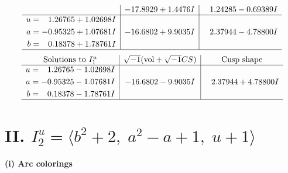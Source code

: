 \documentclass[1p]{elsarticle_modified}
\theoremstyle{definition}
\newcommand{\I}{\sqrt{-1}}
\begin{document}
$$\begin{array}{c|c|c}
 & -17.8929 + 1.4476 I & \phantom{-}1.24285 - 0.69389 I \\ \hline\begin{aligned}
u &= \phantom{-}1.26765 + 1.02698 I \\
a &= -0.95325 + 1.07681 I \\
b &= \phantom{-}0.18378 + 1.78761 I\end{aligned}
 & -16.6802 + 9.9035 I & \phantom{-}2.37944 - 4.78800 I\\
 \hline 
 \end{array}$$\newpage$$\begin{array}{c|c|c}  
\text{Solutions to }I^u_{1}& \I (\text{vol} + \sqrt{-1}CS) & \text{Cusp shape}\\
 \hline 
\begin{aligned}
u &= \phantom{-}1.26765 - 1.02698 I \\
a &= -0.95325 - 1.07681 I \\
b &= \phantom{-}0.18378 - 1.78761 I\end{aligned}
 & -16.6802 - 9.9035 I & \phantom{-}2.37944 + 4.78800 I\\
 \hline 
 \end{array}$$\newpage\newpage\renewcommand{\arraystretch}{1}
\centering \section*{II. $I^u_{2}= \langle b^2+2,\;a^2- a+1,\;u+1 \rangle$}
\flushleft \textbf{(i) Arc colorings}\\
\end{document}
